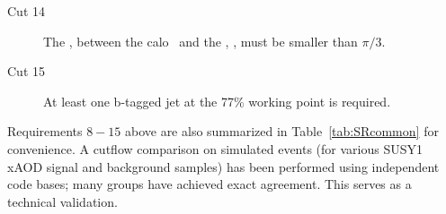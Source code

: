 \begin{description}
\item[Cut 14] The \dphi, between the calo \met\ and the \mettrk, \dphimettrk, must be smaller than $\pi/3$.
\item[Cut 15] At least one b-tagged jet at the 77\% working point is required.
\end{description}

Requirements $8-15$ above are also summarized in Table~\ref{tab:SRcommon} for convenience. A cutflow comparison on simulated events (for various SUSY1 xAOD signal and background samples) has been performed using independent code bases; many groups have achieved exact agreement. This serves as a technical validation.


